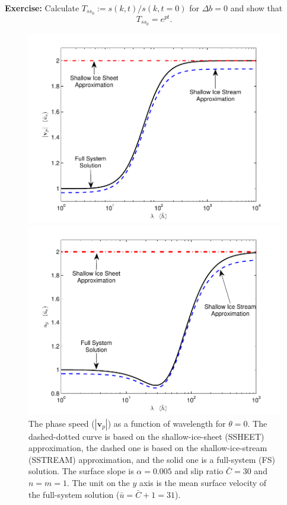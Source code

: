 \documentclass[10pt,a4paper]{book}
\begin{document}
\bigskip
\noindent \textbf{Exercise:} 
Calculate $T_{ss_0}:=s(k,t)/s(k,t=0)$ for $\Delta b=0$ and show that
\begin{equation}
T_{ss_0}=e^{p t}.
\end{equation}



\begin{figure}
  \begin{minipage}[t]{0.5\linewidth}
\centering
\includegraphics[width=\textwidth]{tc-2007-0016-f01a}
\caption{The phase speed  ($|\mathbf{v}_p|$) as a function of
wavelength for $\theta{=}0$. The dashed-dotted curve is based on the
shallow-ice-sheet (SSHEET) approximation, the dashed one is based on
the shallow-ice-stream (SSTREAM) approximation, and the solid one is a
full-system (FS) solution.  The surface slope is $\alpha{=}0.005$ and
slip ratio $\bar{C}{=}30$ and $n=m=1$.  The unit on the $y$ axis is the mean surface
velocity of the full-system solution ($\bar{u}{=}\bar{C}{+}1{=}31$).
\label{fig:Vp}}
\end{minipage}
\hspace{0.5cm}
\begin{minipage}[t]{0.5\linewidth}
\centering
\includegraphics[width=\textwidth]{tc-2007-0016-f01b.pdf}

\end{minipage}
\end{figure}
\end{document}
